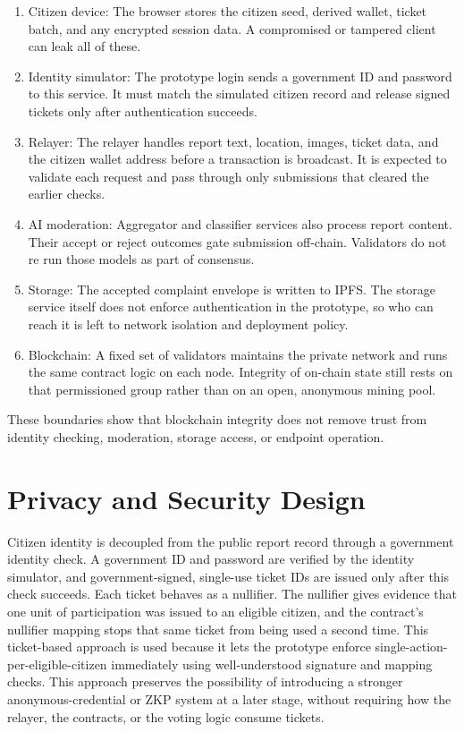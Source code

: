 \begin{enumerate}
    \item Citizen device: The browser stores the citizen seed, derived wallet, ticket batch, and any encrypted session data. A compromised or tampered client can leak all of these.
    \item Identity simulator: The prototype login sends a government ID and password to this service. It must match the simulated citizen record and release signed tickets only after authentication succeeds.
    \item Relayer: The relayer handles report text, location, images, ticket data, and the citizen wallet address before a transaction is broadcast. It is expected to validate each request and pass through only submissions that cleared the earlier checks.
    \item AI moderation: Aggregator and classifier services also process report content. Their accept or reject outcomes gate submission off-chain. Validators do not re run those models as part of consensus.
    \item Storage: The accepted complaint envelope is written to \ac{IPFS}. The storage service itself does not enforce authentication in the prototype, so who can reach it is left to network isolation and deployment policy.
    \item Blockchain: A fixed set of validators maintains the private network and runs the same contract logic on each node. Integrity of on-chain state still rests on that permissioned group rather than on an open, anonymous mining pool.
\end{enumerate}

These boundaries show that blockchain integrity does not remove trust from identity checking, moderation, storage access, or endpoint operation.

\section{Privacy and Security Design}
\label{sec:privacy-security-design}

Citizen identity is decoupled from the public report record through a government identity check. A government ID and password are verified by the identity simulator, and government-signed, single-use ticket IDs are issued only after this check succeeds. Each ticket behaves as a nullifier. The nullifier gives evidence that one unit of participation was issued to an eligible citizen, and the contract's nullifier mapping stops that same ticket from being used a second time. This ticket-based approach is used because it lets the prototype enforce single-action-per-eligible-citizen immediately using well-understood signature and mapping checks. This approach preserves the possibility of introducing a stronger anonymous-credential or \ac{ZKP}  system at a later stage, without requiring how the relayer, the contracts, or the voting logic consume tickets.

